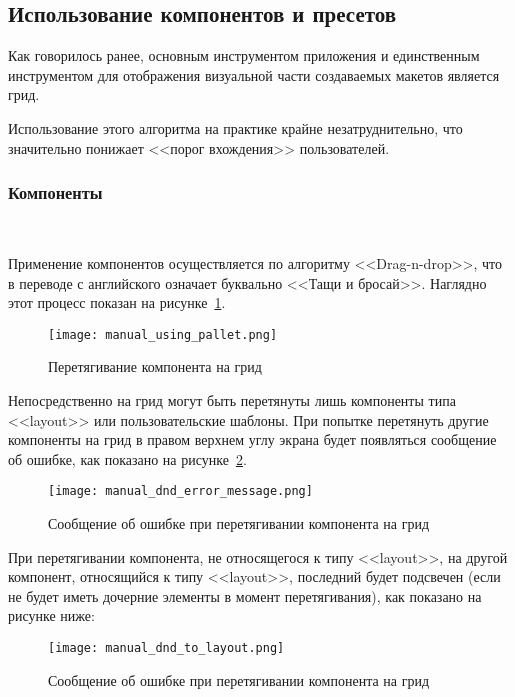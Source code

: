 \subsection{Использование компонентов и пресетов}
\label{sec:manual:inspector_manual}

Как говорилось ранее, основным инструментом приложения и единственным инструментом для отображения визуальной части создаваемых макетов является грид.

Использование этого алгоритма на практике крайне незатруднительно, что значительно понижает <<порог вхождения>> пользователей.

\subsubsection{Компоненты}
\

Применение компонентов осуществляется по алгоритму <<Drag-n-drop>>, что в переводе с английского означает буквально <<Тащи и бросай>>. Наглядно этот процесс показан на рисунке~\ref{sec:manual:manual_using_pallet}.

\begin{figure}[ht]
	\centering
    \texttt{[image: manual\_using\_pallet.png]}
    \caption{Перетягивание компонента на грид}
    \label{sec:manual:manual_using_pallet}
\end{figure}

Непосредственно на грид могут быть перетянуты лишь компоненты типа <<layout>> или пользовательские шаблоны. При попытке перетянуть другие компоненты на грид в правом верхнем углу экрана будет появляться сообщение об ошибке, как показано на рисунке~\ref{sec:manual:manual_dnd_error_message}.

\begin{figure}[ht]
	\centering
    \texttt{[image: manual\_dnd\_error\_message.png]}
    \caption{Сообщение об ошибке при перетягивании компонента на грид}
    \label{sec:manual:manual_dnd_error_message}
\end{figure}

При перетягивании компонента, не относящегося к типу <<layout>>, на другой компонент, относящийся к типу <<layout>>, последний будет подсвечен (если не будет иметь дочерние элементы в момент перетягивания), как показано на рисунке ниже:

\begin{figure}[ht]
	\centering
    \texttt{[image: manual\_dnd\_to\_layout.png]}
    \caption{Сообщение об ошибке при перетягивании компонента на грид}
    \label{sec:manual:manual_dnd_to_layout}
\end{figure}

